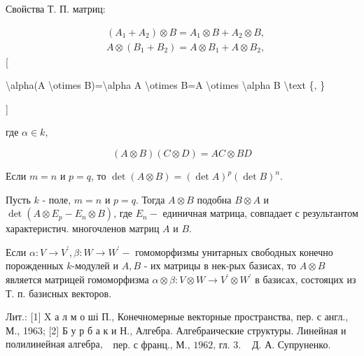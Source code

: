 \documentclass[10pt]{article}
\begin{document}
Свойства Т. П. матриц:



\[

\begin{aligned}

& \left(A_{1}+A_{2}\right) \otimes B=A_{1} \otimes B+A_{2} \otimes B, \\

& A \otimes\left(B_{1}+B_{2}\right)=A \otimes B_{1}+A \otimes B_{2},

\end{aligned}

\][



\textbackslash alpha(A \textbackslash otimes B)=\textbackslash alpha A \textbackslash otimes B=A \textbackslash otimes \textbackslash alpha B \textbackslash text \{, \}

]



где $\alpha \in k$,



\[

(A \otimes B)(C \otimes D)=A C \otimes B D

\]



Если $m=n$ и $p=q$, то $\operatorname{det}(A \otimes B)=(\operatorname{det} A)^{p}(\operatorname{det} B)^{n}$.



Пусть $k$ - поле, $m=n$ и $p=q$. Тогда $A \otimes B$ подобна $B \otimes A$ и $\operatorname{det}\left(A \otimes E_{p}-E_{n} \otimes B\right)$, где $E_{n}-$ единичная матрица, совпадает с результантом характеристич. многочленов матриц $A$ и $B$.



Если $\alpha: V \rightarrow V^{\prime}, \beta: W \rightarrow W^{\prime}-$ гомоморфизмы унитарных свободных конечно порожденных $k$-модулей и $A, B$ - их матрицы в нек-рых базисах, то $A \otimes B$ является матрицей гомоморфизма $\alpha \otimes \beta: V \otimes W \rightarrow V^{\prime} \otimes W^{\prime}$ в базисах, состояцих из Т. п. базисных векторов.



Лит.: [1] X а л м о ші П., Конечномерные векторные пространства, пер. с англ., М., 1963; [2] Б у р б а к и Н., Алгебра. Алгебраические структуры. Линейная и полилинейная алгебра, $\begin{array}{ll}\text { пер. с франц., М., 1962, гл. } 3 . & \text { Д. А. Супруненко. }\end{array}$
\end{document}
